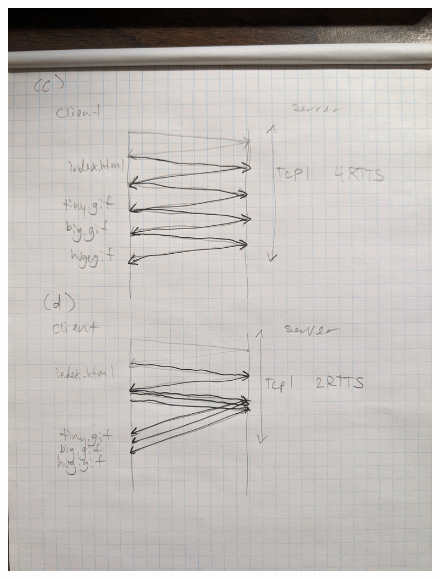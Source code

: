 \documentclass{article}
\begin{document}
\begin{figure}[h]
  \centering
  \includegraphics[width=\textwidth]{2.jpg}
\end{figure}
\end{document}
